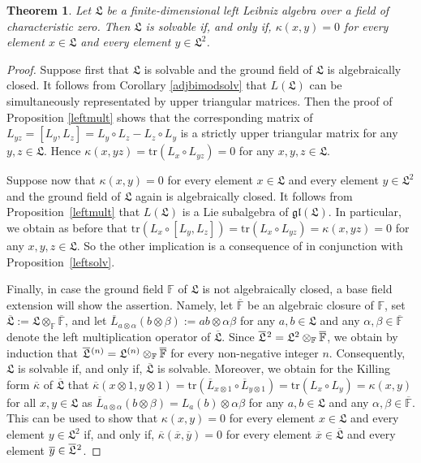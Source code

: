 \documentclass{amsart}
\newtheorem{thm}{Theorem}[section]
\numberwithin{equation}{section}
\newcommand{\tr}{\mathrm{tr}}
\newcommand{\F}{\mathbb{F}}
\newcommand{\lf}{\mathfrak{L}}
\newcommand{\gl}{\mathfrak{gl}}
\begin{document}
\begin{thm}\label{cartan}
Let $\lf$ be a finite-dimensional left Leibniz algebra over a field of characteristic zero. Then $\lf$
is solvable if, and only if, $\kappa(x,y)=0$ for every element $x\in\lf$ and every element $y\in
\lf^2$.
\end{thm}

\begin{proof}
Suppose first that $\lf$ is solvable and the ground field of $\lf$ is algebraically closed. It follows
from Corollary \ref{adjbimodsolv} that $L(\lf)$ can be simultaneously representated by upper
triangular matrices. Then the proof of Proposition \ref{leftmult} shows that the corresponding
matrix of $L_{yz}=[L_y,L_z]=L_y\circ L_z-L_z\circ L_y$ is a strictly upper triangular matrix for
any $y,z\in\lf$. Hence $\kappa(x,yz)=\tr(L_x\circ L_{yz})=0$ for any $x,y,z\in\lf$.

Suppose now that $\kappa(x,y)=0$ for every element $x\in\lf$ and every element $y\in\lf^2$
and the ground field of $\lf$ again is algebraically closed. It follows from Proposition~\ref{leftmult}
that $L(\lf)$ is a Lie subalgebra of $\gl(\lf)$. In particular, we obtain as before that $\tr(L_x\circ
[L_y,L_z])=\tr(L_x\circ L_{yz})=\kappa(x,yz)=0$ for any $x,y,z\in\lf$. So the other implication
is a consequence of \cite[Theorem~4.3]{H} in conjunction with Proposition~\ref{leftsolv}.

Finally, in case the ground field $\F$ of $\lf$ is not algebraically closed, a base field extension
will show the assertion. Namely, let $\overline{\F}$ be an algebraic closure of $\F$, set
$\overline{\lf}:=\lf\otimes_\F\overline{\F}$, and let $\overline{L}_{a\otimes\alpha}(b\otimes
\beta):=ab\otimes\alpha\beta$ for any $a,b\in\lf$ and any $\alpha,\beta\in\overline{\F}$
denote the left multiplication operator of $\overline{\lf}$. Since $\overline{\lf}\hspace{.3mm}^2
=\lf^2\otimes_\F\overline{\F}$, we obtain by induction that $\overline{\lf}\hspace{.3mm}^{(n)}
=\lf^{(n)}\otimes_\F\overline{\F}$ for every non-negative integer $n$. Consequently, $\lf$
is solvable if, and only if, $\overline{\lf}$ is solvable. Moreover, we obtain for the Killing form
$\overline{\kappa}$ of $\overline{\lf}$ that $\overline{\kappa}(x\otimes 1,y\otimes 1)=\tr
(\overline{L}_{x\otimes 1}\circ\overline{L}_{y\otimes 1})=\tr(L_x\circ L_y)=\kappa(x,y)$
for all $x,y\in\lf$ as $\overline{L}_{a\otimes\alpha}(b\otimes\beta)=L_a(b)\otimes\alpha
\beta$ for any $a,b\in\lf$ and any $\alpha,\beta\in\overline{\F}$. This can be used to show
that $\kappa(x,y)=0$ for every element $x\in\lf$ and every element $y\in\lf^2$ if, and only
if, $\overline{\kappa}(\overline{x},\overline{y})=0$ for every element $\overline{x}\in\overline{\lf}$
and every element $\overline{y}\in\overline{\lf}\hspace{.3mm}^2$.
\end{proof}
\end{document}
